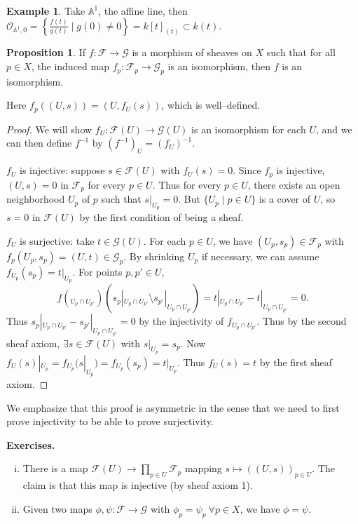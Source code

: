 \documentclass{article}
\theoremstyle{definition}
\newtheorem{prop}[theorem]{Proposition}
\newtheorem{example}{Example}[section]
\begin{document}
\begin{example}
    Take $\mathbb{A}^1$, the affine line, then $\mathcal{O}_{\mathbb{A}^1,0} = \left\{\frac{f(t)}{g(t)} \mid g(0)\neq 0\right\} = k[t]_{(t)} \subset k(t) $.
\end{example}
\begin{prop}
    If $f : \mathcal{F} \to \mathcal{G}$ is a morphism of sheaves on $X$ such that for all $p \in X$, the induced map $f_p :\mathcal{F}_p \to \mathcal{G}_p$ is an isomorphism, then $f$ is an isomorphism.
    \vspace{1mm}
     
    Here $f_p((U,s)) = (U, f_U(s))$, which is well--defined.
\end{prop}
\begin{proof}
    We will show $f_U : \mathcal{F}(U) \to \mathcal{G}(U)$ is an isomorphism for each $U$, and we can then define $f^{-1}$ by $(f^{-1})_U = (f_U)^{-1}$.
    \vspace{1mm}
     
    $f_U$ is injective: suppose $s \in \mathcal{F}(U)$ with $f_U(s) = 0$. Since $f_p$ is injective, $(U,s) = 0$ in $\mathcal{F}_p$ for every $p \in U$. Thus for every $p \in U$, there exists an open neighborhood $U_p$ of $p$ such that $s|_{U_p} = 0$. But $\{U_p \mid p \in U\}$ is a cover of $U$, so $s = 0$ in $\mathcal{F}(U)$ by the first condition of being a sheaf.
    \vspace{1mm}
     
    $f_U$ is surjective: take $t \in \mathcal{G}(U)$. For each $p \in U$, we have $(U_p, s_p) \in \mathcal{F}_p$ with $f_p(U_p, s_p) = (U,t) \in \mathcal{G}_p$. By shrinking $U_p$ if necessary, we can assume $f_{U_p}(s_p) = t|_{U_p}$. For points $p, p' \in U$, $$f(_{U_p \cap U_{p'}}) \left(s_p|_{U_p \cap U_{p'}} \setminus s_{p'}|_{U_p \cap U_{p'}}\right) = t|_{U_p \cap U_{p'}} - t |_{U_p \cap U_{p'}} = 0.$$
    Thus $s_p |_{U_p \cap U_{p'}} - s_{p'}|_{U_p \cap U_{p'}} = 0$ by the injectivity of $f_{U_p \cap U_{p'}}$. Thus by the second sheaf axiom, $\exists s \in \mathcal{F}(U)$ with $s|_{U_p} = s_p$. Now $f_U(s)|_{U_p} = f_{U_p}(s|_{U_p}) = f_{U_p}(s_p) = t|_{U_p}$. Thus $f_U(s) = t$ by the first sheaf axiom.
\end{proof}
We emphasize that this proof is asymmetric in the sense that we need to first prove injectivity to be able to prove surjectivity.

\vspace{1mm}
 
\textbf{Exercises.}
\begin{enumerate}[(i)]
    \item There is a map $\mathcal{F}(U) \to \prod_{p \in U}^{} \mathcal{F}_p$ mapping $s \mapsto ((U,s))_{p \in U}$. The claim is that this map is injective (by sheaf axiom 1).
    \item Given two maps $\phi, \psi : \mathcal{F} \to \mathcal{G}$ with $\phi_p = \psi_p ~\forall p \in X$, we have $\phi = \psi$.
\end{enumerate} 
\end{document}
